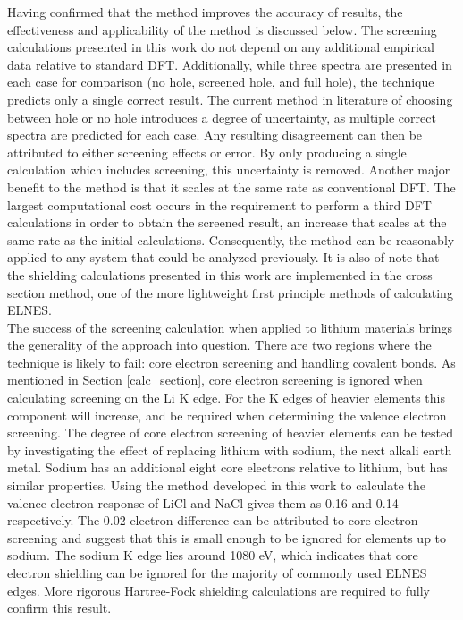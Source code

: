 Having confirmed that the method improves the accuracy of results, the effectiveness and applicability of the method is discussed below. The screening calculations presented in this work do not depend on any additional empirical data relative to standard DFT.  Additionally, while three spectra are presented in each case for comparison (no hole, screened hole, and full hole), the technique predicts only a single correct result.  The current method in literature of choosing between hole or no hole introduces a degree of uncertainty, as multiple correct spectra are predicted for each case.   Any resulting disagreement can then be attributed to either screening effects or error. By only producing a single calculation which includes screening, this uncertainty is removed.  Another major benefit to the method is that it scales at the same rate as conventional DFT.  The largest computational cost occurs in the requirement to perform a third DFT calculations in order to obtain the screened result, an increase that scales at the same rate as the initial calculations.  Consequently, the method can be reasonably applied to any system that could be analyzed previously.  It is also of note that the shielding calculations presented in this work are implemented in the cross section method, one of the more lightweight first principle methods of calculating ELNES.\\



The success of the screening calculation when applied to lithium materials brings the generality of the approach into question. There are two regions where the technique is likely to fail: core electron screening and handling covalent bonds.  As mentioned in Section \ref{calc_section}, core electron screening is ignored when calculating screening on the Li K edge.  For the K edges of heavier elements this component will increase, and be required when determining the valence electron screening. The degree of core electron screening of heavier elements can be tested by investigating the effect of replacing lithium with sodium, the next alkali earth metal.  Sodium has an additional eight core electrons relative to lithium, but has similar properties.  Using the method developed in this work to calculate the valence electron response of LiCl and NaCl gives them as 0.16 and 0.14 respectively.  The 0.02 electron difference can be attributed to core electron screening and suggest that this is small enough to be ignored for elements up to sodium.  The sodium K edge lies around 1080 eV, which indicates that core electron shielding can be ignored for the majority of commonly used ELNES edges.  More rigorous Hartree-Fock shielding calculations are required to fully confirm this result.  

